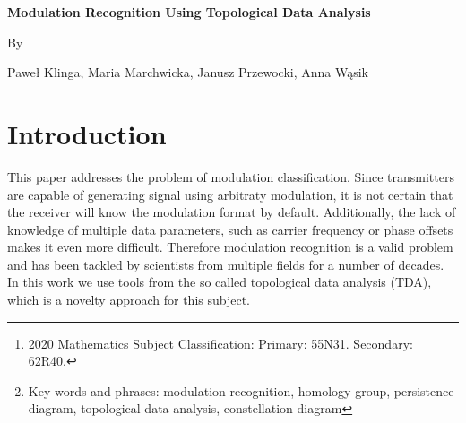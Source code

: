 \documentclass[12pt]{article}
\theoremstyle{plain}
\theoremstyle{definition}
\theoremstyle{remark}
\begin{document}
	
	\begin{center}{\bf \Large
			Modulation Recognition Using Topological Data Analysis
		}
	\end{center}
	\smallskip
	\begin{center}
		By
	\end{center}
	\smallskip
	\begin{center} Pawe\l{} Klinga, Maria Marchwicka, Janusz Przewocki, Anna W\k{a}sik
	\end{center}
	
	\begin{abstract}
		In this paper we present our results of applying topological methods to the classical problem of modulation recognition. We use tools from the growing field of topological data analysis, namely persistent homology, followed by machine learning algorithms to distinguish between a large number of significant modulation types.
		
		The basic idea of topological data analysis is to ``recognize the shape of data'', for instance to calculate the number of cycles and connected components. Sampled signals depending on modulation type have a specific geometric representation. Therefore it seemed a natural idea to apply topological tools.
		
		For the training and evaluation we used Deepsig Dataset RADIOML 2018.01A which was used for \textit{Over-the-air deep learning based radio signal classification} published in 2017 in IEEE Journal of Selected Topics in Signal Processing.
		
		\let\thefootnote\relax\footnote{2020 Mathematics Subject Classification: Primary: 55N31. Secondary: 62R40.
		}
		\let\thefootnote\relax\footnote{Key words and phrases: modulation recognition, homology group, persistence diagram, topological data analysis, constellation diagram}
	\end{abstract}
	
	
	\section{Introduction}
	
	This paper addresses the problem of modulation classification. Since transmitters are capable of generating signal using arbitraty modulation, it is not certain that the receiver will know the modulation format by default. Additionally, the lack of knowledge of multiple data parameters, such as carrier frequency or phase offsets makes it even more difficult. Therefore modulation recognition is a valid problem and has been tackled by scientists from multiple fields for a number of decades. In this work we use tools from the so called topological data analysis (TDA), which is a novelty approach for this subject.
	
\end{document}
